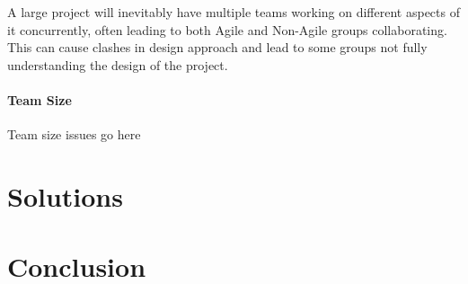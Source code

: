 \documentclass{article}
\begin{document}
A large project will inevitably have multiple teams working on different aspects of it concurrently, often leading to both Agile and Non-Agile groups collaborating. This can cause clashes in design approach and lead to some groups not fully understanding the design of the project. 

 

\paragraph{Team Size}\mbox{}\newline

Team size issues go here

\section{Solutions}


\section{Conclusion}





\end{document}
